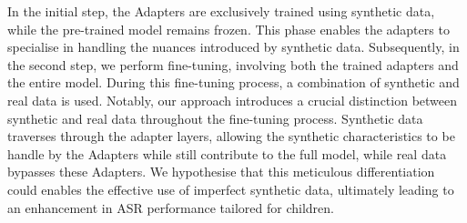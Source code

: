In the initial step, the Adapters are exclusively trained using synthetic data, while the pre-trained model remains frozen. This phase enables the adapters to specialise in handling the nuances introduced by synthetic data. Subsequently, in the second step, we perform fine-tuning, involving both the trained adapters and the entire model. During this fine-tuning process, a combination of synthetic and real data is used. Notably, our approach introduces a crucial distinction between synthetic and real data throughout the fine-tuning process. Synthetic data traverses through the adapter layers, allowing the synthetic characteristics to be handle by the Adapters while  still contribute to the full model, while real data bypasses these Adapters. We hypothesise that this meticulous differentiation could enables the effective use of imperfect synthetic data, ultimately leading to an enhancement in ASR performance tailored for children.




